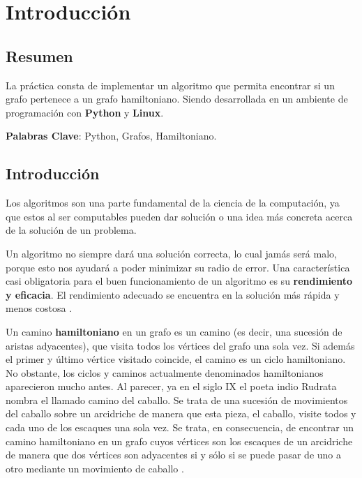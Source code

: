 
\chapter{Introducción}



\section{Resumen}
    La práctica consta de implementar un algoritmo que permita encontrar si un grafo pertenece a un grafo hamiltoniano. Siendo desarrollada en un ambiente de programación con \textbf{Python} y \textbf{Linux}.
    
    \textbf{Palabras Clave}: Python, Grafos, Hamiltoniano.

\section{Introducción}

    Los algoritmos son una parte fundamental de la ciencia de la computación, ya que estos al ser computables pueden dar solución o una idea más concreta acerca de la solución de un problema.
    
    Un algoritmo no siempre dará una solución correcta, lo cual jamás será malo, porque esto nos ayudará a poder minimizar su radio de error. Una característica casi obligatoria para el buen funcionamiento de un algoritmo es su \textbf{rendimiento y eficacia}. El rendimiento adecuado se encuentra en la solución más rápida y menos costosa \cite{Algorithm}.

    Un camino \textbf{hamiltoniano} en un grafo es un camino (es decir, una sucesión de aristas adyacentes), que visita todos los vértices del grafo una sola vez. Si además el primer y último vértice visitado coincide, el camino es un ciclo hamiltoniano. No obstante, los ciclos y caminos actualmente denominados hamiltonianos aparecieron mucho antes. Al parecer, ya en el siglo IX el poeta indio Rudrata nombra el llamado camino del caballo. Se trata de una sucesión de movimientos del caballo sobre un arcidriche de manera que esta pieza, el caballo, visite todos y cada uno de los escaques una sola vez. Se trata, en consecuencia, de encontrar un camino hamiltoniano en un grafo cuyos vértices son los escaques de un arcidriche de manera que dos vértices son adyacentes si y sólo si se puede pasar de uno a otro mediante un movimiento de caballo \cite{Hamil}. 





    
